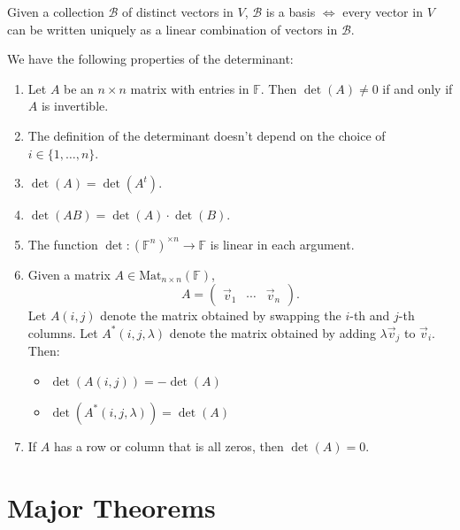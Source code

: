 \documentclass{article}
\newcommand{\secbreak}{\noindent \hrulefill \vspace{1cm}}
\begin{document}
\begin{theorem}[1.8 in Book]
    Given a collection \( \mathcal{B} \) of distinct vectors in \( V \), \( \mathcal{B} \) is a basis 
    \(\iff\) every vector in \( V \) can be written uniquely as a linear combination of vectors in \( \mathcal{B} \).
\end{theorem}



\begin{proposition} 
We have the following properties of the determinant: 
\begin{enumerate}
    \item Let \( A \) be an \( n \times n \) matrix with entries in \( \mathbb{F} \). Then \(\det(A) \neq 0 \) if and only if \( A \) is invertible.
    \item The definition of the determinant doesn't depend on the choice of \( i \in \{1, \ldots, n\} \).
    \item \(\det(A) = \det(A^t)\).
    \item \(\det(AB) = \det(A) \cdot \det(B)\).
    \item The function \(\det: (\mathbb{F}^n)^{\times n} \to \mathbb{F}\) is linear in each argument.
    \item Given a matrix \( A \in \mathrm{Mat}_{n \times n}(\mathbb{F}) \),
    \[
    A = \begin{pmatrix}
    \vec{v}_1 & \cdots & \vec{v}_n
    \end{pmatrix}.
    \]
    Let \( A(i, j) \) denote the matrix obtained by swapping the \( i \)-th and \( j \)-th columns. Let \( A^*(i, j, \lambda) \) denote the matrix obtained by adding \(\lambda \vec{v}_j \) to \(\vec{v}_i \). Then:
    \begin{itemize}
        \item \(\det(A(i, j)) = -\det(A)\)
        \item \(\det(A^*(i, j, \lambda)) = \det(A)\)
    \end{itemize}
    \item If \( A \) has a row or column that is all zeros, then \(\det(A) = 0\).
\end{enumerate}
\end{proposition}



\secbreak

\section*{Major Theorems}
\end{document}
